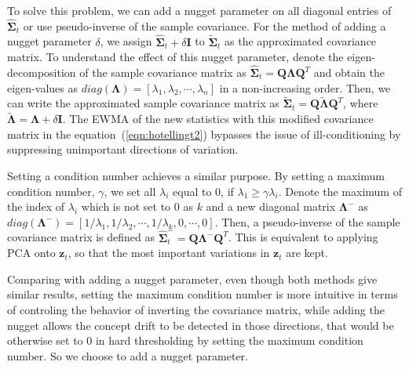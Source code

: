 \documentclass[twoside,11pt]{article}
\begin{document}
To solve this problem, we can add a nugget parameter on all diagonal entries of $\hat {\bm { \Sigma}}_t$ or use pseudo-inverse of the sample covariance. For the method of adding a nugget parameter $ \delta$, we assign $\hat {\bm { \Sigma}}_t+ \delta \bm {I}$ to $\tilde {\bm { \Sigma}}_t$ as the approximated covariance matrix. To understand the effect of this nugget parameter, denote the eigen-decomposition of the sample covariance matrix as $\hat {\bm { \Sigma}}_t = \bm {Q}\bm { \Lambda} \bm {Q}^T$ and obtain the eigen-values as $ diag(\bm{\Lambda}) = [ \lambda_1, \lambda_2,\cdots, \lambda_n]$ in a non-increasing order. Then, we can write the approximated sample covariance matrix as $\tilde {\bm { \Sigma}}_t = \bm {Q}\tilde{\bm { \Lambda}} \bm {Q}^T$, where $\tilde{\bm { \Lambda}} = \bm { \Lambda} + \delta \bm {I}$. The EWMA of the new statistics with this modified covariance matrix in the equation~(\ref{eqn:hotellingt2}) bypasses the issue of ill-conditioning by suppressing unimportant directions of variation. 

Setting a condition number achieves a similar purpose. By setting a maximum condition number, $ \gamma$, we set all $ \lambda_i$ equal to $0$, if $ \lambda_1 \geq \gamma \lambda_i$. Denote the maximum of the index of $ \lambda_i$ which is not set to $0$ as $k$ and a new diagonal matrix $\bm { \Lambda} ^{-}$ as $diag(\bm { \Lambda} ^{-}) = [1/\lambda_1,1/\lambda_2, \cdots, 1/\lambda_k, 0, \cdots, 0]$. Then, a pseudo-inverse of the sample covariance matrix is defined as $\hat {\bm { \Sigma}}_t ^{-} = \bm {Q}\bm { \Lambda}^{-}\bm {Q}^T$. This is equivalent to applying PCA onto $\bm {z}_t$, so that the most important variations in $\bm {z}_t$ are kept. 

Comparing with adding a nugget parameter, even though both methods give similar results, setting the maximum condition number is more intuitive in terms of controling the behavior of inverting the covariance matrix, while adding the nugget allows the concept drift to be detected in those directions, that would be otherwise set to $0$ in hard thresholding by setting the maximum condition number. So we choose to add a nugget parameter.
\end{document}
